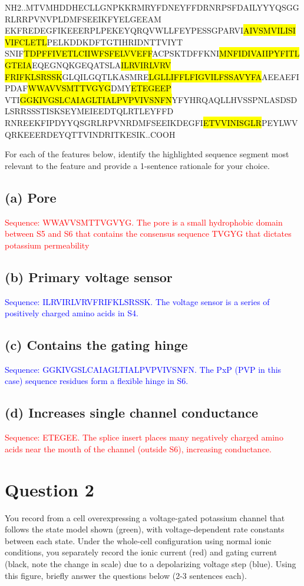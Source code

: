 \documentclass{article}
\begin{document}
NH2..MTVMHDDHECLLGNPKKRMRYFDNEYFFDRNRPSFDAILYYYQSGGRLRRPVNVPLDMFSEEIKFYELGEEAM
EKFREDEGFIKEEERPLPEKEYQRQVWLLFEYPESSGPARVI\hl{AIVSMVILISIVIFCLETL}PELKDDKDFTGTIHRIDNTTVIYT
SNIF\hl{TDPFFIVETLCIIWFSFELVVEFF}ACPSKTDFFKNI\hl{MNFIDIVAIIPYFITLGTEIA}EQEGNQKGEQATSLA\hl{ILRVIRLVRV}
\hl{FRIFKLSRSSK}GLQILGQTLKASMRE\hl{LGLLIFFLFIGVILFSSAVYFA}AEEAEFIPDAF\hl{WWAVVSMTTVGYG}DMY\hl{ETEGEEP}
VTI\hl{GGKIVGSLCAIAGLTIALPVPVIVSNFN}YFYHRQAQLLHVSSPNLASDSDLSRRSSSTISKSEYMEIEEDTQLRTLEYFFD
RNREEKFIPDYYQSGRLRPVNRDMFSEEIKDEGFI\hl{ETVVINISGLR}PEYLWVQRKEEERDEYQTTVINDRITKESIK..COOH

For each of the features below, identify the highlighted sequence segment most relevant to the feature
and provide a 1-sentence rationale for your choice.

\subsection*{(a) Pore}
\textcolor{red}{Sequence: WWAVVSMTTVGVYG. The pore is a small hydrophobic domain between S5 and
S6 that contains the consensus sequence TVGYG that dictates potassium permeability}
\subsection*{(b) Primary voltage sensor}
\textcolor{blue}{Sequence: ILRVIRLVRVFRIFKLSRSSK. The voltage sensor is a series of positively charged amino acids in S4.}
\subsection*{(c) Contains the gating hinge}
\textcolor{blue}{Sequence: GGKIVGSLCAIAGLTIALPVPVIVSNFN. The PxP (PVP in this case) sequence residues form a flexible hinge in S6.}
\subsection*{(d) Increases single channel conductance}
\textcolor{red}{Sequence: ETEGEE. The splice insert places many
negatively charged amino acids near the mouth of the channel (outside S6), increasing
conductance.}
\section*{Question 2}
You record from a cell overexpressing a voltage-gated potassium channel that follows the state model
shown (green), with voltage-dependent rate constants between each state. Under the whole-cell
configuration using normal ionic conditions, you separately record the ionic current (red) and gating
current (black, note the change in scale) due to a depolarizing voltage step (blue). Using this figure,
briefly answer the questions below (2-3 sentences each).
\end{document}
